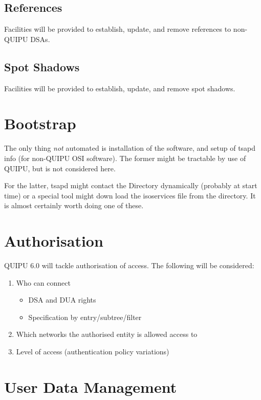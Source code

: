 \subsection {References}

Facilities will be provided to establish, update, and remove references to
non-QUIPU DSAs.

\subsection {Spot Shadows}

Facilities will be provided to establish, update, and remove spot shadows.

\section {Bootstrap}

The only thing {\em not} automated is installation of the software, and
setup of tsapd info (for non-QUIPU OSI software).  The former might be
tractable by use of QUIPU, but is not considered here.  

For the latter, tsapd might contact the Directory dynamically (probably at
start time) or a special tool might down load the isoservices file from the
directory.   It is almost certainly worth doing one of these.

\section {Authorisation}

QUIPU 6.0 will tackle authorisation of access.  The following will be
considered:

\begin {enumerate}
\item Who can connect
\begin {itemize}
\item DSA and DUA rights
\item Specification by entry/subtree/filter
\end {itemize}

\item Which networks the authorised entity is allowed access to

\item Level of access (authentication policy variations)

\end {enumerate}


\section {User Data Management}

